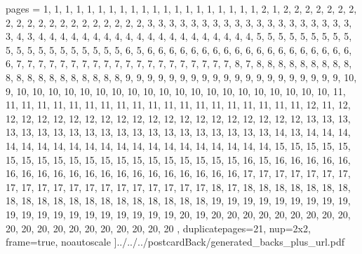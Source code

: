 \documentclass[letterpaper]{article}
\begin{document}

	pages = 	{ %
											1,	1,	1,	1,	1,	1,	1,	1,	1,	1,	1,	1,	1,	1,	1,	1,	1,	1,	1,	1,
											2,	1,
											2,	2,	2,	2,	2,	2,	2,	2,	2,	2,	2,	2,	2,	2,	2,	2,	2,	2,	2,	2,
											3,	3,	3,	3,	3,	3,	3,	3,	3,	3,	3,	3,	3,	3,	3,	3,	3,	3,	3,	3,
											4,	3,
											4,	4,	4,	4,	4,	4,	4,	4,	4,	4,	4,	4,	4,	4,	4,	4,	4,	4,	4,	4,
											5,	5,	5,	5,	5,	5,	5,	5,	5,	5,	5,	5,	5,	5,	5,	5,	5,	5,	5,	5,
											6,	5,
											6,	6,	6,	6,	6,	6,	6,	6,	6,	6,	6,	6,	6,	6,	6,	6,	6,	6,	6,	6,
											7,	7,	7,	7,	7,	7,	7,	7,	7,	7,	7,	7,	7,	7,	7,	7,	7,	7,	7,	7,
											8,	7,
											8,	8,	8,	8,	8,	8,	8,	8,	8,	8,	8,	8,	8,	8,	8,	8,	8,	8,	8,	8,
											9,	9,	9,	9,	9,	9,	9,	9,	9,	9,	9,	9,	9,	9,	9,	9,	9,	9,	9,	9,
											10, 9,
											10,	10,	10,	10,	10,	10,	10,	10,	10,	10,	10,	10,	10,	10,	10,	10,	10,	10,	10,	10,
											11,	11,	11,	11,	11,	11,	11,	11,	11,	11,	11,	11,	11,	11,	11,	11,	11,	11,	11,	11,
											12,	11,
											12,	12,	12,	12,	12,	12,	12,	12,	12,	12,	12,	12,	12,	12,	12,	12,	12,	12,	12,	12,
											13,	13,	13,	13,	13,	13,	13,	13,	13,	13,	13,	13,	13,	13,	13,	13,	13,	13,	13,	13,
											14, 	13,
											14,	14,	14,	14,	14,	14,	14,	14,	14,	14,	14,	14,	14,	14,	14,	14,	14,	14,	14,	14,
											15,	15,	15,	15,	15,	15,	15,	15,	15,	15,	15,	15,	15,	15,	15,	15,	15,	15,	15,	15,
											16,	15,
											16,	16,	16,	16,	16,	16,	16,	16,	16,	16,	16,	16,	16,	16,	16,	16,	16,	16,	16,	16,
											17,	17,	17,	17,	17,	17,	17,	17,	17,	17,	17,	17,	17,	17,	17,	17,	17,	17,	17,	17,
											18,	17,
											18,	18,	18,	18,	18,	18,	18,	18,	18,	18,	18,	18,	18,	18,	18,	18,	18,	18,	18,	18,
											19,	19,	19,	19,	19,	19,	19,	19,	19,	19,	19,	19,	19,	19,	19,	19,	19,	19,	19,	19,
											20,	19,
											20,	20,	20,	20,	20,	20,	20,	20,	20,	20,	20,	20,	20,	20,	20,	20,	20,	20,	20,	20
										},
						duplicatepages=21,
						nup=2x2,
						frame=true,
						noautoscale
					]{../../../postcardBack/generated_backs_plus_url.pdf}
\end{document}
